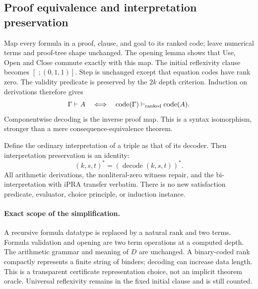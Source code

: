 \subsection{Proof equivalence and interpretation preservation}
Map every formula in a proof, clause, and goal to its ranked code;
leave numerical terms and proof-tree shape unchanged. The opening lemma
shows that Use, Open and Close commute exactly with this map.
The initial reflexivity clause becomes
\([\,\,;(0,1,1)]\).
Step is unchanged except that equation codes have rank zero.
The validity predicate is preserved by the \(2k\) depth criterion.
Induction on derivations therefore gives
\[
 \Gamma\vdash A\quad\Longleftrightarrow\quad
 \operatorname{code}(\Gamma)\vdash_{\rm ranked}\operatorname{code}(A).
\]
Componentwise decoding is the inverse proof map. This is a syntax
isomorphism, stronger than a mere consequence-equivalence theorem.

Define the ordinary interpretation of a triple as that of its decoder.
Then interpretation preservation is an identity:
\[
 (k,s,t)^*=(\operatorname{decode}(k,s,t))^*.
\]
All arithmetic derivations, the nonliteral-zero witness repair, and the
bi-interpretation with iPRA transfer verbatim. There is no new satisfaction
predicate, evaluator, choice principle, or induction instance.

\paragraph{Exact scope of the simplification.}
A recursive formula datatype is replaced by a natural rank and two terms.
Formula validation and opening are two term operations at a computed
depth. The arithmetic grammar and meaning of \(D\) are unchanged.
A binary-coded rank compactly represents a finite string of binders;
decoding can increase data length. This is a transparent certificate
representation choice, not an implicit theorem oracle. Universal
reflexivity remains in the fixed initial clause and is still counted.


